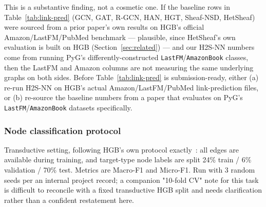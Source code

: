 \documentclass{article}
\begin{document}
\begin{table}[h]
  \centering
  \caption{Link prediction: dataset identity requires verification before Table~\ref{tab:link-pred} can be trusted as an apples-to-apples comparison.}
  \label{tab:dataset-stats-link}
  \small
\end{table}

This is a substantive finding, not a cosmetic one. If the baseline rows in
Table~\ref{tab:link-pred} (GCN, GAT, R-GCN, HAN, HGT, Sheaf-NSD, HetSheaf) were sourced from a prior
paper's own results on HGB's official Amazon/LastFM/PubMed benchmark --- plausible, since
HetSheaf's own evaluation is built on HGB (Section~\ref{sec:related}) --- and our H2S-NN numbers
come from running PyG's differently-constructed \texttt{LastFM}/\texttt{AmazonBook} classes, then
the LastFM and Amazon columns are not measuring the same underlying graphs on both sides. Before
Table~\ref{tab:link-pred} is submission-ready, either (a) re-run H2S-NN on HGB's actual
Amazon/LastFM/PubMed link-prediction files, or (b) re-source the baseline numbers from a paper that
evaluates on PyG's \texttt{LastFM}/\texttt{AmazonBook} datasets specifically.

\subsubsection{Node classification protocol}
Transductive setting, following HGB's own protocol exactly~\citep{lv2021hgb}: all edges are
available during training, and target-type node labels are split 24\% train / 6\% validation / 70\%
test. Metrics are Macro-F1 and Micro-F1. Run with 3 random seeds per an internal project record; a
companion "10-fold CV" note for this task is difficult to reconcile with a fixed transductive HGB
split and needs clarification rather than a confident restatement here.
\end{document}
